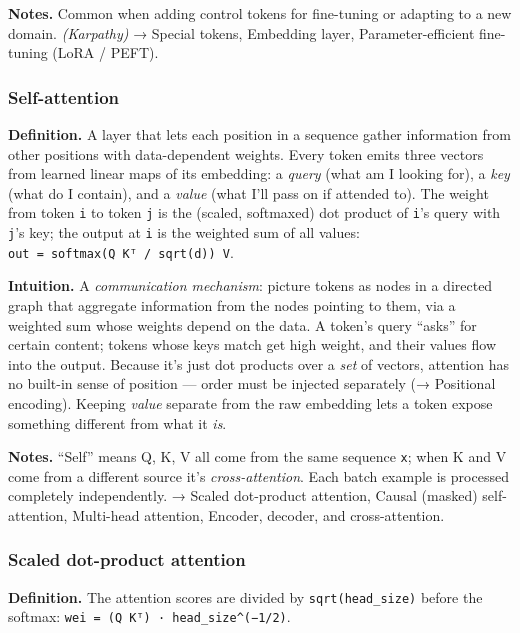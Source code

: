 \documentclass[
  10pt,
  letterpaper,
  onecolumn]{article}
\begin{document}
\textbf{Notes.} Common when adding control tokens for fine-tuning or
adapting to a new domain. \emph{(Karpathy)} → Special tokens, Embedding
layer, Parameter-efficient fine-tuning (LoRA / PEFT).

\hypertarget{self-attention}{%
\subsubsection{Self-attention}\label{self-attention}}

\textbf{Definition.} A layer that lets each position in a sequence
gather information from other positions with data-dependent weights.
Every token emits three vectors from learned linear maps of its
embedding: a \emph{query} (what am I looking for), a \emph{key} (what do
I contain), and a \emph{value} (what I'll pass on if attended to). The
weight from token \texttt{i} to token \texttt{j} is the (scaled,
softmaxed) dot product of \texttt{i}'s query with \texttt{j}'s key; the
output at \texttt{i} is the weighted sum of all values:
\texttt{out\ =\ softmax(Q\ Kᵀ\ /\ sqrt(d))\ V}.

\textbf{Intuition.} A \emph{communication mechanism}: picture tokens as
nodes in a directed graph that aggregate information from the nodes
pointing to them, via a weighted sum whose weights depend on the data. A
token's query ``asks'' for certain content; tokens whose keys match get
high weight, and their values flow into the output. Because it's just
dot products over a \emph{set} of vectors, attention has no built-in
sense of position --- order must be injected separately (→ Positional
encoding). Keeping \emph{value} separate from the raw embedding lets a
token expose something different from what it \emph{is}.

\textbf{Notes.} ``Self'' means Q, K, V all come from the same sequence
\texttt{x}; when K and V come from a different source it's
\emph{cross-attention}. Each batch example is processed completely
independently. → Scaled dot-product attention, Causal (masked)
self-attention, Multi-head attention, Encoder, decoder, and
cross-attention.

\hypertarget{scaled-dot-product-attention}{%
\subsubsection{Scaled dot-product
attention}\label{scaled-dot-product-attention}}

\textbf{Definition.} The attention scores are divided by
\texttt{sqrt(head\_size)} before the softmax:
\texttt{wei\ =\ (Q\ Kᵀ)\ ·\ head\_size\^{}(−1/2)}.
\end{document}
